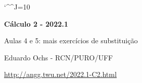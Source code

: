 \documentclass[oneside,12pt]{article}
\begin{document}
\catcode`\^^J=10
\pu


\def\u#1{\par{\footnotesize \url{#1}}}

\def\drafturl{http://angg.twu.net/LATEX/2022-1-C2.pdf}
\def\drafturl{http://angg.twu.net/2022.1-C2.html}
\def\draftfooter{\tiny \href{\drafturl}{\jobname{}} \ColorBrown{\shorttoday{} \hours}}

\unitlength=25pt
\celllower=3pt
\def\nodesize{0.9}
\def\nodecolor{AntiqueWhite1}
\def\nodecolor{Gold1!50!white}
\def\nodecolor{Orange!50!white}
\def\nodeify#1{%
    {\color{\nodecolor}\circle*{\nodesize}}%
    \circle{\nodesize}%
    \cell{#1}%
  }
\def\Sone{[\mathsf{S1}]}
\def\Stwo{[\mathrm{S2}]}
\def\putnode(#1,#2)#3{\put(#1,#2){\nodeify{#3}}}

\celllower=3pt
\def\nodesize{0.9}
\def\nodecolor{Orange!50!white}
\def\nodeify#1{%
    {\color{\nodecolor}\circle*{\nodesize}}%
    \circle{\nodesize}%
    \cell{#1}%
  }
\def\putnode(#1,#2)#3{\put(#1,#2){\nodeify{#3}}}

\def\snodesize{0.2}
\def\snodecolor{blue}
\def\snode{%
    {\color{\snodecolor}\circle*{\snodesize}}%
    \circle{\snodesize}%
  }




%

\thispagestyle{empty}

\begin{center}

\vspace*{1.2cm}

{\bf \Large Cálculo 2 - 2022.1}

\bsk

Aulas 4 e 5: mais exercícios de substituição

\bsk

Eduardo Ochs - RCN/PURO/UFF

\url{http://angg.twu.net/2022.1-C2.html}

\end{center}
\end{document}
